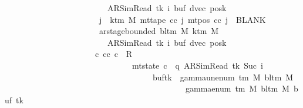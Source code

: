 \begin{isabellebody}
\ \ \ \ \ \ \ \ \ \ \ \ \ \ \ \ \ \ \ \ \ \ \ \ \ {\isacharparenleft}{\kern0pt}AR{\isacharunderscore}{\kern0pt}SimRead{\isacharcomma}{\kern0pt}\ tk{\isacharcomma}{\kern0pt}\ i{\isacharcomma}{\kern0pt}\ buf{\isacharprime}{\kern0pt}{\isacharcomma}{\kern0pt}\ dvec{\isacharcomma}{\kern0pt}\ posk{\isacharparenright}{\kern0pt}{\isacharsemicolon}{\kern0pt}\isanewline
\ \ \ \ \ \ \ \ \ \ \ \ \ \ \ \ \ \ \ \ \ \ \ {\isasymforall}j\ {\isasymge}\ k{\isacharunderscore}{\kern0pt}tm\ M{\isachardot}{\kern0pt}\ mt{\isacharunderscore}{\kern0pt}tape\ cc\ j\ {\isacharparenleft}{\kern0pt}mt{\isacharunderscore}{\kern0pt}pos\ cc\ j{\isacharparenright}{\kern0pt}\ {\isacharequal}{\kern0pt}\ BLANK{}{\isacharsemicolon}{\kern0pt}\isanewline
\ \ \ \ \ \ \ \ \ \ \ \ \ \ \ \ \ \ \ \ \ \ \ ar{\isacharunderscore}{\kern0pt}stage{\isacharunderscore}{\kern0pt}bounded\ {\isacharparenleft}{\kern0pt}bl{\isacharunderscore}{\kern0pt}tm\ M{\isacharparenright}{\kern0pt}\ {\isacharparenleft}{\kern0pt}k{\isacharunderscore}{\kern0pt}tm\ M{\isacharparenright}{\kern0pt}\isanewline
\ \ \ \ \ \ \ \ \ \ \ \ \ \ \ \ \ \ \ \ \ \ \ \ \ {\isacharparenleft}{\kern0pt}AR{\isacharunderscore}{\kern0pt}SimRead{\isacharcomma}{\kern0pt}\ tk{\isacharcomma}{\kern0pt}\ i{\isacharcomma}{\kern0pt}\ buf{\isacharprime}{\kern0pt}{\isacharcomma}{\kern0pt}\ dvec{\isacharcomma}{\kern0pt}\ posk{\isacharparenright}{\kern0pt}\ {\isasymrbrakk}\isanewline
\ \ \ \ \ \ \ \ \ \ \ \ \ \ \ \ \ \ \ \ \ {\isasymLongrightarrow}\ {\isasymexists}c{\isacharprime}{\kern0pt}{\isacharprime}{\kern0pt}{\isachardot}{\kern0pt}\ {\isacharparenleft}{\kern0pt}cc{\isacharcomma}{\kern0pt}\ c{\isacharprime}{\kern0pt}{\isacharprime}{\kern0pt}{\isacharparenright}{\kern0pt}\ {\isasymin}\ R{\isacharprime}{\kern0pt}\isanewline
\ \ \ \ \ \ \ \ \ \ \ \ \ \ \ \ \ \ \ \ \ \ \ \ \ \ \ \ \ \ {\isasymand}\ mt{\isacharunderscore}{\kern0pt}state\ c{\isacharprime}{\kern0pt}{\isacharprime}{\kern0pt}\ {\isacharequal}{\kern0pt}\ {\isacharparenleft}{\kern0pt}q{\isacharcomma}{\kern0pt}\ AR{\isacharunderscore}{\kern0pt}SimRead{\isacharcomma}{\kern0pt}\ tk{\isacharcomma}{\kern0pt}\ Suc\ i{\isacharcomma}{\kern0pt}\isanewline
\ \ \ \ \ \ \ \ \ \ \ \ \ \ \ \ \ \ \ \ \ \ \ \ \ \ \ \ \ \ \ \ \ \ \ \ buf{\isacharprime}{\kern0pt}{\isacharparenleft}{\kern0pt}tk\ {\isacharcolon}{\kern0pt}{\isacharequal}{\kern0pt}\ gamma{\isacharunderscore}{\kern0pt}unenum\ {\isacharparenleft}{\kern0pt}{\isasymGamma}{\isacharunderscore}{\kern0pt}tm\ M{\isacharparenright}{\kern0pt}\ {\isacharparenleft}{\kern0pt}bl{\isacharunderscore}{\kern0pt}tm\ M{\isacharparenright}{\kern0pt}\isanewline
\ \ \ \ \ \ \ \ \ \ \ \ \ \ \ \ \ \ \ \ \ \ \ \ \ \ \ \ \ \ \ \ \ \ \ \ \ \ \ \ \ \ {\isacharparenleft}{\kern0pt}{}\ {\isacharasterisk}{\kern0pt}\ gamma{\isacharunderscore}{\kern0pt}enum\ {\isacharparenleft}{\kern0pt}{\isasymGamma}{\isacharunderscore}{\kern0pt}tm\ M{\isacharparenright}{\kern0pt}\ {\isacharparenleft}{\kern0pt}bl{\isacharunderscore}{\kern0pt}tm\ M{\isacharparenright}{\kern0pt}\ {\isacharparenleft}{\kern0pt}buf{\isacharprime}{\kern0pt}\ tk{\isacharparenright}{\kern0pt}\isanewline

\end{isabellebody}
